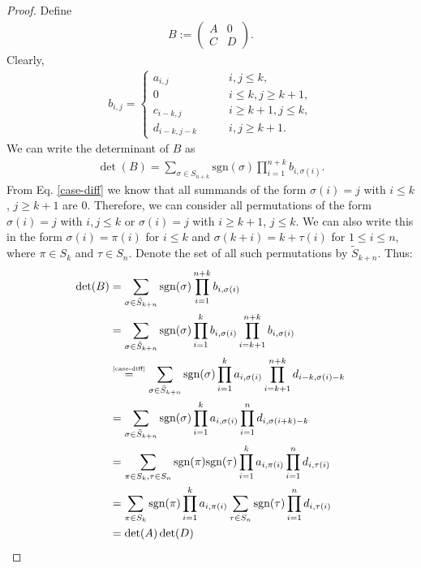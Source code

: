 \documentclass[12pt, a4paper]{article}
\numberwithin{equation}{section}
\theoremstyle{definition}
\theoremstyle{definition}
\begin{document}
	\begin{proof}
		Define 
		\begin{align}
			B := \begin{pmatrix} A & 0 \\ C & D
			\end{pmatrix}. 
		\end{align}
		Clearly, 
		\begin{align}\label{case-diff}
			b_{i,j} = 
			\begin{cases}
				a_{i, j} \qquad &i, j\leq k, \\
				0 		 \qquad &i\leq k, j \geq k+1, \\
				c_{i-k, j} \qquad &i\geq k+1, j \leq k, \\
				d_{i-k, j-k} \qquad &i, j\geq k+1. 
			\end{cases}
		\end{align}
		We can write the determinant of $B$ as 
		\begin{align}
			\det(B) = \sum_{\sigma\in S_{n+k}} \text{sgn}(\sigma)\prod_{i = 1}^{n+k}b_{i, \sigma(i)}. 
		\end{align}
		From Eq. \eqref{case-diff} we know that all summands of the form $\sigma(i) = j$ with $i\leq k$, $j\geq k+1$ are $0$. Therefore, we can consider all permutations of the form $\sigma(i) = j$ with $i, j \leq k$ or $\sigma(i) = j$ with $i\geq k+1$, $j\leq k$. We can also write this in the form $\sigma(i) = \pi(i)$ for $i\leq k$ and $\sigma(k + i) = k + \tau(i)$ for $1\leq i \leq n$, where $\pi\in S_k$ and $\tau\in S_n$. Denote the set of all such permutations by $\tilde{S}_{k+n}$.  Thus: 
		\begin{align}
			\det(B) &= \sum_{\sigma\in\tilde{S}_{k+n}}\text{sgn}(\sigma)\prod_{i = 1}^{n+k}b_{i, \sigma(i)}
			\\ &= \sum_{\sigma\in\tilde{S}_{k+n}}\text{sgn}(\sigma)\prod_{i = 1}^{k}b_{i, \sigma(i)}\prod_{i = k+1}^{n+k}b_{i, \sigma(i)}
			\\ &\overset{\tiny\eqref{case-diff}}{=} \sum_{\sigma\in\tilde{S}_{k+n}}\text{sgn}(\sigma)\prod_{i = 1}^{k}a_{i, \sigma(i)}\prod_{i=k+1}^{n+k}d_{i-k, \sigma(i)-k}
			\\ &= \sum_{\sigma\in\tilde{S}_{k+n}}\text{sgn}(\sigma)\prod_{i = 1}^{k}a_{i, \sigma(i)}\prod_{i = 1}^{n}d_{i, \sigma(i+k)-k}
			\\ &= \sum_{\pi\in S_k, \tau\in S_n}\text{sgn}(\pi)\text{sgn}(\tau)\prod_{i = 1}^{k}a_{i, \pi(i)}\prod_{i = 1}^{n}d_{i, \tau(i)}
			\\ &= \sum_{\pi\in S_k}\text{sgn}(\pi)\prod_{i = 1}^{k}a_{i, \pi(i)}\sum_{\tau\in S_n}\text{sgn}(\tau)\prod_{i = 1}^{n}d_{i, \tau(i)}
			\\ &= \det(A)\det(D)
		\end{align}
		\cite{block-triangular-matrix}
	\end{proof} 
		
\end{document}
